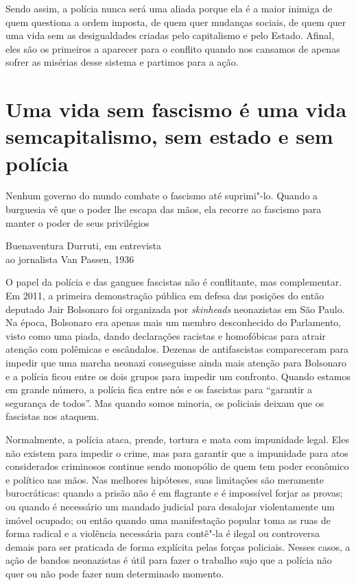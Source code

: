 Sendo assim, a polícia nunca será uma aliada porque ela é a maior inimiga de quem questiona a ordem imposta, de quem quer mudanças sociais, de quem quer uma vida sem as desigualdades criadas pelo capitalismo e pelo Estado. Afinal, eles são os primeiros a aparecer para o conflito quando nos cansamos de apenas sofrer as misérias desse sistema e partimos para a ação.

\section{Uma vida sem fascismo é uma vida sem\break capitalismo, sem estado e sem polícia}

\epigraph{Nenhum governo do mundo combate o fascismo até suprimi"-lo. Quando a burguesia vê que o poder lhe escapa das mãos, ela recorre ao fascismo para manter o poder de seus privilégios}{Buenaventura Durruti, em entrevista\\ ao jornalista Van Passen, 1936}

O papel da polícia e das gangues fascistas não é conflitante, mas complementar. Em 2011, a primeira demonstração pública em defesa das posições do então deputado Jair Bolsonaro foi organizada por \emph{skinheads} neonazistas em São Paulo. Na época, Bolsonaro era apenas mais um membro desconhecido do Parlamento, visto como uma piada, dando declarações racistas e homofóbicas para atrair atenção com polêmicas e escândalos. Dezenas de antifascistas compareceram para impedir que uma marcha neonazi conseguisse ainda mais atenção para Bolsonaro e a polícia ficou entre os dois grupos para impedir um confronto. Quando estamos em grande número, a polícia fica entre nós e os fascistas para ``garantir a segurança de todos''. Mas quando somos minoria, os policiais deixam que os fascistas nos ataquem.

Normalmente, a polícia ataca, prende, tortura e mata com impunidade legal. Eles não existem para impedir o crime, mas para garantir que a impunidade para atos considerados criminosos continue sendo monopólio de quem tem poder econômico e político nas mãos. Nas melhores hipóteses, suas limitações são meramente burocráticas: quando a prisão não é em flagrante e é impossível forjar as provas; ou quando é necessário um mandado judicial para desalojar violentamente um imóvel ocupado; ou então quando uma manifestação popular toma as ruas de forma radical e a violência necessária para contê"-la é ilegal ou controversa demais para ser praticada de forma explícita pelas forças policiais. Nesses casos, a ação de bandos neonazistas é útil para fazer o trabalho sujo que a polícia não quer ou não pode fazer num determinado momento.

